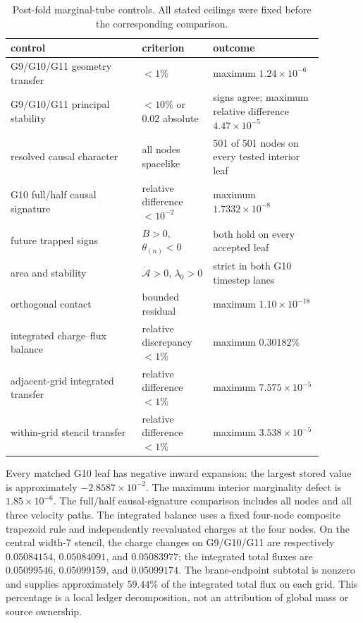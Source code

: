\documentclass[11pt]{article}
\begin{document}
\begin{table}[ht]
\centering
\caption{Post-fold marginal-tube controls.  All stated ceilings were fixed
before the corresponding comparison.}
\label{tab:supp-tube-controls}
\begin{tabular}{@{}p{0.37\linewidth}p{0.20\linewidth}p{0.31\linewidth}@{}}
\toprule
control & criterion & outcome \\
\midrule
G9/G10/G11 geometry transfer & $<1\%$ & maximum $1.24\times10^{-6}$ \\
G9/G10/G11 principal stability & $<10\%$ or $0.02$ absolute & signs agree; maximum relative difference $4.47\times10^{-5}$ \\
resolved causal character & all nodes spacelike & 501 of 501 nodes on every tested interior leaf \\
G10 full/half causal signature & relative difference $<10^{-2}$ & maximum $1.7332\times10^{-8}$ \\
future trapped signs & $B>0$, $\theta_{(n)}<0$ & both hold on every accepted leaf \\
area and stability & $\dot{\mathcal A}>0$, $\lambda_0>0$ & strict in both G10 timestep lanes \\
orthogonal contact & bounded residual & maximum $1.10\times10^{-18}$ \\
integrated charge--flux balance & relative discrepancy $<1\%$ & maximum $0.30182\%$ \\
adjacent-grid integrated transfer & relative difference $<1\%$ & maximum $7.575\times10^{-5}$ \\
within-grid stencil transfer & relative difference $<1\%$ & maximum $3.538\times10^{-5}$ \\
\bottomrule
\end{tabular}
\end{table}

Every matched G10 leaf has negative inward expansion; the largest stored value
is approximately $-2.8587\times10^{-2}$.  The maximum interior marginality
defect is $1.85\times10^{-6}$.  The full/half causal-signature comparison
includes all nodes and all three velocity paths.  The integrated balance uses
a fixed four-node composite trapezoid rule and independently reevaluated
charges at the four nodes.  On the central width-7 stencil, the charge changes
on G9/G10/G11 are respectively $0.05084154$, $0.05084091$, and $0.05083977$;
the integrated total fluxes are $0.05099546$, $0.05099159$, and $0.05099174$.
The brane-endpoint subtotal is nonzero and supplies approximately $59.44\%$ of
the integrated total flux on each grid.  This percentage is a local ledger
decomposition, not an attribution of global mass or source ownership.
\end{document}
